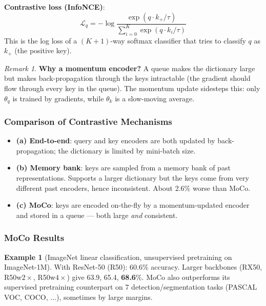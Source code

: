 \documentclass[11pt,a4paper]{article}
\theoremstyle{definition}
\newtheorem{example}{Example}[section]
\theoremstyle{plain}
\theoremstyle{remark}
\newtheorem*{remark}{Remark}
\begin{document}
\textbf{Contrastive loss (InfoNCE)}:
\begin{equation}
    \mathcal{L}_q = -\log \frac{\exp(q \cdot k_+ / \tau)}{\sum_{i=0}^{K} \exp(q \cdot k_i / \tau)}
\end{equation}
This is the log loss of a $(K+1)$-way softmax classifier that tries to classify $q$ as $k_+$ (the positive key).

\begin{remark}
\textbf{Why a momentum encoder?} A queue makes the dictionary large but makes back-propagation through the keys intractable (the gradient should flow through every key in the queue). The momentum update sidesteps this: only $\theta_q$ is trained by gradients, while $\theta_k$ is a slow-moving average.
\end{remark}

\subsubsection{Comparison of Contrastive Mechanisms}

\begin{itemize}
    \item \textbf{(a) End-to-end}: query and key encoders are both updated by back-propagation; the dictionary is limited by mini-batch size.
    \item \textbf{(b) Memory bank}: keys are sampled from a memory bank of past representations. Supports a larger dictionary but the keys come from very different past encoders, hence inconsistent. About 2.6\% worse than MoCo.
    \item \textbf{(c) MoCo}: keys are encoded on-the-fly by a momentum-updated encoder and stored in a queue --- both large \emph{and} consistent.
\end{itemize}

\subsubsection{MoCo Results}

\begin{example}[ImageNet linear classification, unsupervised pretraining on ImageNet-1M]
With ResNet-50 (R50): 60.6\% accuracy. Larger backbones (RX50, R50w$2\times$, R50w$4\times$) give 63.9, 65.4, \textbf{68.6}\%. MoCo also outperforms its supervised pretraining counterpart on 7 detection/segmentation tasks (PASCAL VOC, COCO, $\ldots$), sometimes by large margins.
\end{example}
\end{document}
